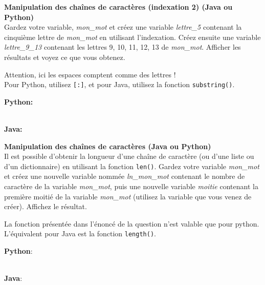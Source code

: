 \begin{Exercice}[5 minutes] \textbf{Manipulation des chaînes de caractères (indexation 2) (Java ou Python)}\\
   Gardez votre variable, \textit{mon\_mot} et créez une variable \textit{lettre\_5} contenant la cinquième lettre de \textit{mon\_mot} en utilisant l'indexation. Créez ensuite une variable \textit{lettre\_9\_13} contenant les lettres 9, 10, 11, 12, 13 de \textit{mon\_mot}. Afficher les résultats et voyez ce que vous obtenez.  \\
   
    \begin{conseil}
      	Attention, ici les espaces comptent comme des lettres ! \\

		Pour Python, utilisez \lstinline{[:]}, et pour Java, utilisez la fonction \lstinline{substring()}.
        
    \end{conseil}
    \begin{solution}
    
    \textbf{Python:}    
    
    
    \textbf{\\Java:}
    
           
    \end{solution}   
\end{Exercice}

\begin{Exercice}[10 minutes] \textbf{Manipulation des chaînes de caractères (Java ou Python) \optionnel}\\
   Il est possible d'obtenir la longueur d'une chaîne de caractère (ou d'une liste ou d'un dictionnaire) en utilisant la fonction \lstinline{len()}. Gardez votre variable \textit{mon\_mot} et créez une nouvelle variable nommée \textit{ln\_mon\_mot} contenant le nombre de caractère de la variable \textit{mon\_mot}, puis une nouvelle variable \textit{moitie} contenant la première moitié de la variable \textit{mon\_mot} (utilisez la variable que vous venez de créer). Affichez le résultat.   \\
   
    \begin{conseil}
      	La fonction présentée dans l'énoncé de la question n'est valable que pour python. L'équivalent pour Java est la fonction \lstinline{length()}.
        
    \end{conseil}
    \begin{solution}
    
    \textbf{Python}:
    
    
    \textbf{\\Java}:
    
    \end{solution}   
\end{Exercice}

